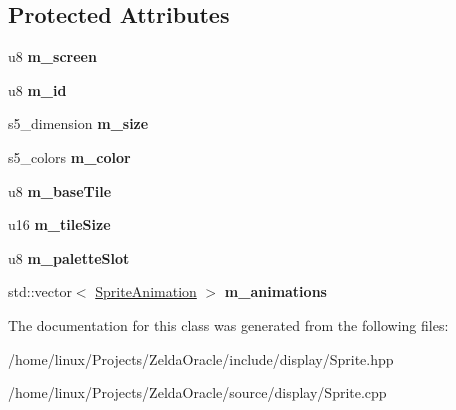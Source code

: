 \subsection*{Protected Attributes}
\begin{DoxyCompactItemize}
\item 
\hypertarget{classSprite_a0563d59ccc4bf4f3ed47a9dea46c8b18}{u8 {\bfseries m\+\_\+screen}}\label{classSprite_a0563d59ccc4bf4f3ed47a9dea46c8b18}

\item 
\hypertarget{classSprite_a7b32e8dcd40a03954c3f2afd0b5a7d95}{u8 {\bfseries m\+\_\+id}}\label{classSprite_a7b32e8dcd40a03954c3f2afd0b5a7d95}

\item 
\hypertarget{classSprite_a1fbd3dd9bae872f5198fe23ff674d568}{s5\+\_\+dimension {\bfseries m\+\_\+size}}\label{classSprite_a1fbd3dd9bae872f5198fe23ff674d568}

\item 
\hypertarget{classSprite_a60aa50330a44abfb6defd4ef37c86044}{s5\+\_\+colors {\bfseries m\+\_\+color}}\label{classSprite_a60aa50330a44abfb6defd4ef37c86044}

\item 
\hypertarget{classSprite_a8a6cd96e1c882a0a6f39064c162c150a}{u8 {\bfseries m\+\_\+base\+Tile}}\label{classSprite_a8a6cd96e1c882a0a6f39064c162c150a}

\item 
\hypertarget{classSprite_ad9409d7e3de265d8a967a4ea7ccc9070}{u16 {\bfseries m\+\_\+tile\+Size}}\label{classSprite_ad9409d7e3de265d8a967a4ea7ccc9070}

\item 
\hypertarget{classSprite_acc78719792d7dc0d094ec08ac598e376}{u8 {\bfseries m\+\_\+palette\+Slot}}\label{classSprite_acc78719792d7dc0d094ec08ac598e376}

\item 
\hypertarget{classSprite_afed43cbdbec4fbdd8138844384e788ef}{std\+::vector$<$ \hyperlink{structSpriteAnimation}{Sprite\+Animation} $>$ {\bfseries m\+\_\+animations}}\label{classSprite_afed43cbdbec4fbdd8138844384e788ef}

\end{DoxyCompactItemize}


The documentation for this class was generated from the following files\+:\begin{DoxyCompactItemize}
\item 
/home/linux/\+Projects/\+Zelda\+Oracle/include/display/Sprite.\+hpp\item 
/home/linux/\+Projects/\+Zelda\+Oracle/source/display/Sprite.\+cpp\end{DoxyCompactItemize}
